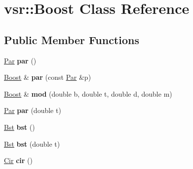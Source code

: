 \hypertarget{classvsr_1_1_boost}{\section{vsr\-:\-:Boost Class Reference}
\label{classvsr_1_1_boost}
}
\subsection*{Public Member Functions}
\begin{DoxyCompactItemize}
\item 
\hypertarget{classvsr_1_1_boost_a06dde9be05aef5216a145fc2278d4b33}{\hyperlink{namespacevsr_ae046793ece205351429a6346a66fd6eb}{Par} {\bfseries par} ()}\label{classvsr_1_1_boost_a06dde9be05aef5216a145fc2278d4b33}

\item 
\hypertarget{classvsr_1_1_boost_ae006762d852f9b7f24b25e09012b116b}{\hyperlink{classvsr_1_1_boost}{Boost} \& {\bfseries par} (const \hyperlink{namespacevsr_ae046793ece205351429a6346a66fd6eb}{Par} \&p)}\label{classvsr_1_1_boost_ae006762d852f9b7f24b25e09012b116b}

\item 
\hypertarget{classvsr_1_1_boost_ae037d5ca343fccaf408a7aa268fb3ca5}{\hyperlink{classvsr_1_1_boost}{Boost} \& {\bfseries mod} (double b, double t, double d, double m)}\label{classvsr_1_1_boost_ae037d5ca343fccaf408a7aa268fb3ca5}

\item 
\hypertarget{classvsr_1_1_boost_a1a9f28590779c0e259d2e83fb799eea6}{\hyperlink{namespacevsr_ae046793ece205351429a6346a66fd6eb}{Par} {\bfseries par} (double t)}\label{classvsr_1_1_boost_a1a9f28590779c0e259d2e83fb799eea6}

\item 
\hypertarget{classvsr_1_1_boost_ad6520b2f87f366e08dcf12202364201e}{\hyperlink{namespacevsr_a9f737171e19572794ba7b6c12e8e679f}{Bst} {\bfseries bst} ()}\label{classvsr_1_1_boost_ad6520b2f87f366e08dcf12202364201e}

\item 
\hypertarget{classvsr_1_1_boost_a91d5d7d1126017f27ce0dd7b60688923}{\hyperlink{namespacevsr_a9f737171e19572794ba7b6c12e8e679f}{Bst} {\bfseries bst} (double t)}\label{classvsr_1_1_boost_a91d5d7d1126017f27ce0dd7b60688923}

\item 
\hypertarget{classvsr_1_1_boost_a7ebf5e8faa586ab806d7adf794c8ba4e}{\hyperlink{namespacevsr_a2744605aa828e495fc85463b7ae0d045}{Cir} {\bfseries cir} ()}\label{classvsr_1_1_boost_a7ebf5e8faa586ab806d7adf794c8ba4e}


\end{DoxyCompactItemize}
